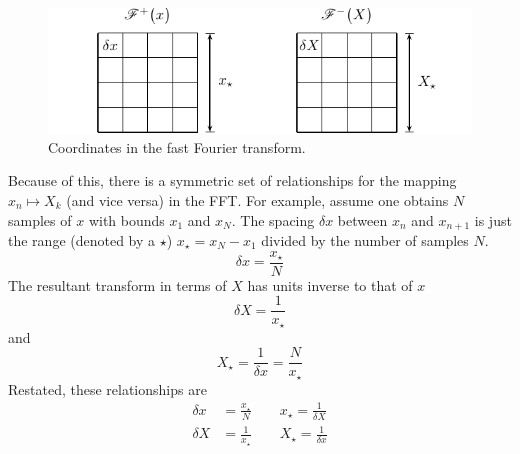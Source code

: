 \begin{figure}[ht]
\centering
\includegraphics[keepaspectratio]{speckle/figures/fftdrawing.pdf}
\caption{Coordinates in the fast Fourier transform.}
\label{fig:fftdrawing}
\end{figure}
Because of this, there is a symmetric set of relationships for the mapping
$x_n \mapsto X_k$ (and vice versa) in the FFT.  For example, assume one
obtains $N$ samples of $x$ with bounds $x_1$ and $x_N$.  The
spacing $\delta x$ between $x_n$ and $x_{n+1}$ is just the range (denoted
by a $\star$)
$x_\star = x_N-x_1$ divided by the number of samples $N$. 
\begin{equation}
\delta x = \frac{x_\star}{N}
\end{equation}
The resultant transform in terms of $X$ has units inverse to that of $x$
\begin{equation}
\delta X = \frac{1}{x_\star}
\end{equation}
and
\begin{equation}
X_\star=\frac{1}{\delta x}=\frac{N}{x_\star}
\end{equation}
Restated, these relationships are
\begin{align}
\delta x &= \frac{x_\star}{N}\qquad x_\star
=\frac{1}{\delta X} \\
\delta X &= \frac{1}{x_\star}\qquad X_\star = \frac{1}{\delta x}
\label{eqn:fftrelationships}
\end{align}

